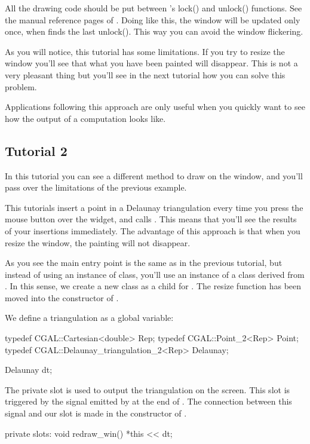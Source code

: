 All the drawing code should be put between 's lock() and
unlock() functions. See the manual reference pages of
. Doing like this, the window will be updated only
once, when  finds the last unlock(). This way you
can avoid the window flickering.

As you will notice, this tutorial has some limitations. If you try to
resize the window you'll see that what you have been painted will
disappear. This is not a very pleasant thing but you'll see in the
next tutorial how you can solve this problem.

Applications following this approach are only useful when you quickly
want to see how the output of a computation looks like.

\subsection*{Tutorial 2}

In this tutorial you can see a different method to draw on the window,
and you'll pass over the limitations of the previous example.

This tutorials insert a point in a Delaunay triangulation every time
you press the mouse button over the widget, and calls . This
means that you'll see the results of your insertions immediately. The
advantage of this approach is that when you resize the window, the
painting will not disappear.

As you see the main entry point is the same as in the previous
tutorial, but instead of using an instance of 
class, you'll use an instance of a class derived from .
In this sense, we create a new class  as a child for
. The resize function has been moved into the
constructor of .

We define a triangulation as a global variable:
\begin{ccExampleCode}
typedef CGAL::Cartesian<double>             Rep;
typedef CGAL::Point_2<Rep>                  Point;
typedef CGAL::Delaunay_triangulation_2<Rep> Delaunay;

Delaunay dt;
\end{ccExampleCode}
The private slot  is used to output the
triangulation on the screen. This slot is triggered by the
 signal emitted by  at the end of 
. The connection between this signal and our slot is
made in the constructor of .
\begin{ccExampleCode}
private slots:
  void redraw_win()
  {
    *this << dt;
  }
\end{ccExampleCode}

